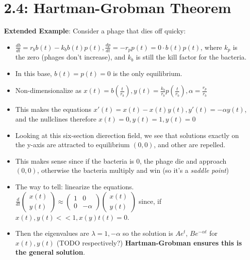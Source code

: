 \documentclass[11pt, oneside]{article}   	%
\begin{document}
\section{2.4: Hartman-Grobman Theorem}

\textbf{Extended Example}: Consider a phage that dies off quicky:
\begin{itemize}
\item $\frac{db}{dt} = r_bb(t)-k_bb(t)p(t), \frac{dp}{dt} = -r_pp(t) = 0 \cdot b(t)p(t)$, where $k_p$ is the zero (phages don't increase), and $k_b$ is still the kill factor for the bacteria.
\item In this base, $b(t) = p(t) = 0$ is the only equilibrium.
\item Non-dimensionalize as $x(t) = b(\frac{t}{r_b}), y(t) = \frac{k_b}{r_b}p(\frac{t}{r_b}), \alpha = \frac{r_p}{r_b}$
\item This makes the equations $x'(t) = x(t) - x(t)y(t), y'(t) = -\alpha y(t)$, and the nullclines therefore $x(t) = 0, y(t) = 1, y(t) = 0$
\item Looking at this six-section dierection field, we see that solutions exactly on the y-axis are attracted to equilibrium $(0,0)$, and other are repelled.
\item This makes sense since if the bacteria is 0, the phage die and approach $(0,0)$, otherwise the bacteria multiply and win (so it's a \emph{saddle point})
\item The way to tell: linearize the equations.  $\frac{d}{dt} \begin{pmatrix} x(t) \\ y(t) \end{pmatrix} \approx \begin{pmatrix} 1 & 0 \\ 0 & -\alpha \end{pmatrix}  \begin{pmatrix} x(t) \\ y(t) \end{pmatrix} $ since, if $x(t), y(t) << 1,  x(y)t(t) = 0$.  
\item Then the eigenvalues are $\lambda = 1, -\alpha$ so the solution is $Ae^t$,  $Be^{-\alpha t}$ for $x(t), y(t)$ (TODO respectively?) \textbf{Hartman-Grobman ensures this is the general solution}.
 \end{itemize}
\end{document}

